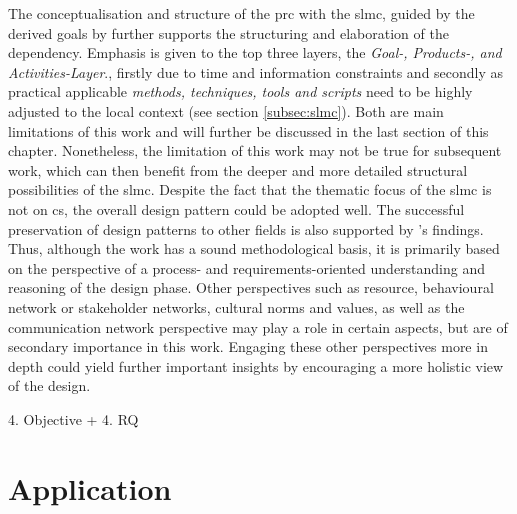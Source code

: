 The conceptualisation and structure of the \acrshort{prc} with the \acrlong{slmc}, guided by the derived goals by \autocite{minkmanCitizenScienceWater2015} further supports the structuring and elaboration of the dependency. Emphasis is given to the top three layers, the \textit{Goal-, Products-, and Activities-Layer}., firstly due to time and information constraints and secondly as practical applicable\textit{ methods, techniques, tools and scripts} need to be highly adjusted to the local context (see section \ref{subsec:slmc}). Both are main limitations of this work and will further be discussed in the last section of this chapter. Nonetheless, the limitation of this work may not be true for subsequent work, which can then benefit from the deeper and more detailed structural possibilities of the \acrshort{slmc}. Despite the fact that the thematic focus of the \acrshort{slmc} is not on \acrshort{cs}, the overall design pattern could be adopted well. The successful preservation of design patterns to other fields is also supported by \autocite{diggelenGroundedDesignDesign2009}'s findings. Thus, although the work has a sound methodological basis, it is primarily based on the perspective of a process- and requirements-oriented understanding and reasoning of the design phase. Other perspectives such as resource, behavioural network or stakeholder networks, cultural norms and values, as well as the communication network perspective may play a role in certain aspects, but are of secondary importance in this work. Engaging these other perspectives more in depth could yield further important insights by encouraging a more holistic view of the design.


4. Objective + 4. RQ
\section{Application}

